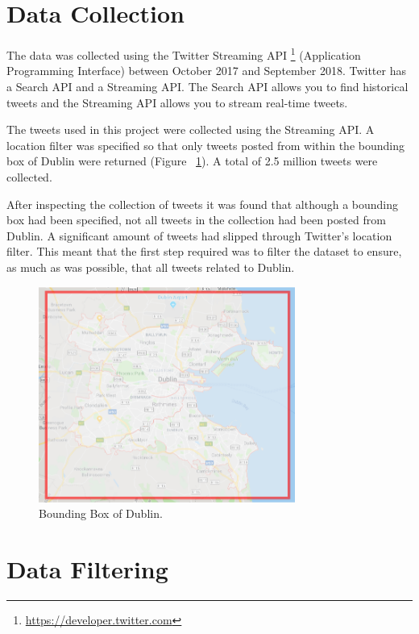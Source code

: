 \section{Data Collection}
The data was collected using the Twitter Streaming API \footnote{\url{https://developer.twitter.com}} (Application Programming Interface) between October 2017 and September 2018. Twitter has a Search API and a Streaming API. The Search API allows you to find historical tweets and the Streaming API allows you to stream real-time tweets.

The tweets used in this project were collected using the Streaming API. A location filter was specified so that only tweets posted from within the bounding box of Dublin were returned (Figure ~\ref{fig:dublinBB}). A total of 2.5 million tweets were collected.

After inspecting the collection of tweets it was found that although a bounding box had been specified, not all tweets in the collection had been posted from Dublin. A significant amount of tweets had slipped through Twitter's location filter. This meant that the first step required was to filter the dataset to ensure, as much as was possible, that all tweets related to Dublin.

\begin{figure}[h!]
\centering
\includegraphics[width=0.75\textwidth]{design_and_methodology/dublinBB.png}
\caption{\label{fig:dublinBB} Bounding Box of Dublin.}
\end{figure}

\section{Data Filtering}

